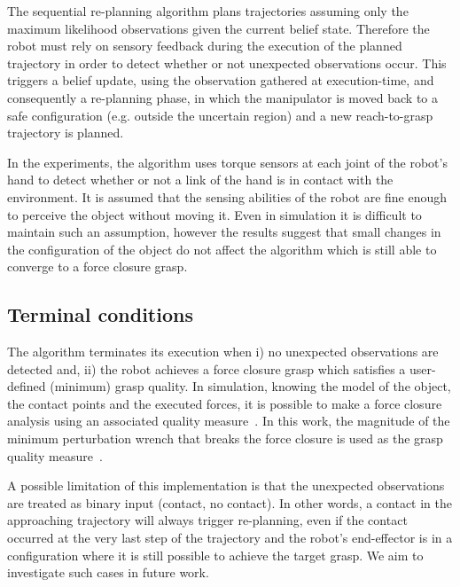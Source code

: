 The sequential re-planning algorithm plans trajectories assuming only the maximum likelihood observations given the current belief state. Therefore the robot must rely on sensory feedback during the execution of the planned trajectory in order to detect whether or not unexpected observations occur. This triggers a belief update, using the observation gathered at execution-time, and consequently a re-planning phase, in which the manipulator is moved back to a safe configuration (e.g. outside the uncertain region) and a new reach-to-grasp trajectory is planned. 

In the experiments, the algorithm uses torque sensors at each joint of the robot's hand to detect whether or not a link of the hand is in contact with the environment. 
It is assumed that the sensing abilities of the robot are fine enough to perceive the object without moving it. Even in simulation it is difficult to maintain such an assumption, however the results suggest that small changes in the configuration of the object do not affect the algorithm which is still able to converge to a force closure grasp. 
 

\subsection{Terminal conditions}

The algorithm terminates its execution when i) no unexpected observations are detected and, ii) the robot achieves a force closure grasp which satisfies a user-defined (minimum) grasp quality. In simulation, knowing the model of the object, the contact points and the executed forces, it is possible to make a force closure analysis using an associated quality measure~\citep{bib:roa_2006}. In this work, the magnitude of the minimum perturbation wrench that breaks the force closure is used as the grasp quality measure~\citep{bib:ferrari_1992}.

A possible limitation of this implementation is that the unexpected observations are treated as binary input (contact, no contact). In other words, a contact in the approaching trajectory will always trigger re-planning, even if the contact occurred at the very last step of the trajectory and the robot's end-effector is in a configuration where it is still possible to achieve the target grasp. We aim to investigate such cases in future work.  



